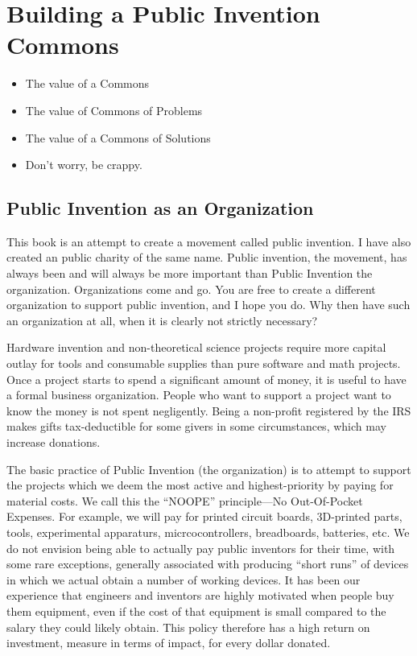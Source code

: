 \documentclass[
	fontsize=10pt, %
	twoside=false, %
	secnumdepth=1, %
]{kaobook}
\begin{document}
\chapter{Building a Public Invention Commons}
\begin{itemize}
\item The value of a Commons
\item The value of Commons of Problems
\item The value of a Commons of Solutions
\item Don’t worry, be crappy.
\end{itemize}

\section{Public Invention as an Organization}

This book is an attempt to create a movement called public invention.
I have also created an public charity of the same name.
Public invention, the movement, has always been and will always be more important than Public Invention the organization.
Organizations come and go.
You are free to create a different organization to support public invention, and I hope you do.
Why then have such an organization at all, when it is clearly not strictly necessary?

Hardware invention and non-theoretical science projects require more capital outlay
for tools and consumable supplies than pure software and math projects.
Once a project starts to spend a significant amount of money, it is useful to have a formal business organization.
People who want to support a project want to know the money is not spent negligently.
Being a non-profit registered by the IRS makes gifts tax-deductible for some givers in some circumstances,
which may increase donations.

The basic practice of Public Invention (the organization) is to attempt to
support the projects which we deem the most active and highest-priority
by paying for material costs.
We call this the ``NOOPE'' principle---No Out-Of-Pocket Expenses.
For example, we will pay for printed circuit boards, 3D-printed parts, tools,
experimental apparaturs, micrcocontrollers, breadboards, batteries, etc.
We do not envision being able to actually pay public inventors for their
time, with some rare exceptions, generally associated with producing
``short runs'' of devices in which we actual obtain a number of working devices.
It has been our experience that engineers and inventors are highly motivated when people
buy them equipment, even if the cost of that equipment is small compared to the
salary they could likely obtain.
This policy therefore has a high return on investment, measure in terms of impact,
for every dollar donated.
\end{document}
